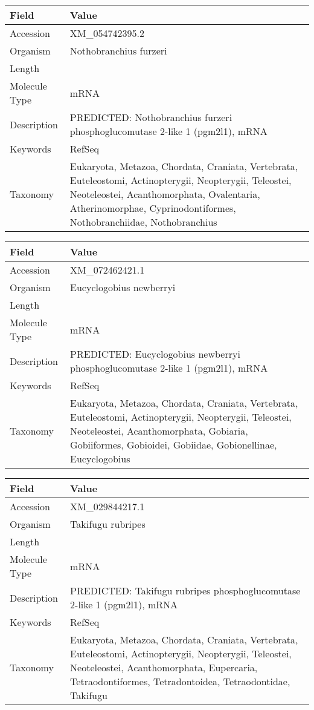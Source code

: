 \documentclass[10pt]{article}
\begin{document}
{\footnotesize
\begin{longtable}{>{\raggedright\arraybackslash}p{4.5cm} >{\raggedright\arraybackslash}p{11.5cm}}
\textbf{Field} & \textbf{Value} \\
\hline
Accession & XM\_054742395.2 \\
Organism & Nothobranchius furzeri \\
Length & 2982 \\
Molecule Type & mRNA \\
Description & PREDICTED: Nothobranchius furzeri phosphoglucomutase 2-like 1 (pgm2l1), mRNA \\
Keywords & RefSeq \\
Taxonomy & Eukaryota, Metazoa, Chordata, Craniata, Vertebrata, Euteleostomi, Actinopterygii, Neopterygii, Teleostei, Neoteleostei, Acanthomorphata, Ovalentaria, Atherinomorphae, Cyprinodontiformes, Nothobranchiidae, Nothobranchius \\
\end{longtable}
}

{\footnotesize
\begin{longtable}{>{\raggedright\arraybackslash}p{4.5cm} >{\raggedright\arraybackslash}p{11.5cm}}
\textbf{Field} & \textbf{Value} \\
\hline
Accession & XM\_072462421.1 \\
Organism & Eucyclogobius newberryi \\
Length & 3030 \\
Molecule Type & mRNA \\
Description & PREDICTED: Eucyclogobius newberryi phosphoglucomutase 2-like 1 (pgm2l1), mRNA \\
Keywords & RefSeq \\
Taxonomy & Eukaryota, Metazoa, Chordata, Craniata, Vertebrata, Euteleostomi, Actinopterygii, Neopterygii, Teleostei, Neoteleostei, Acanthomorphata, Gobiaria, Gobiiformes, Gobioidei, Gobiidae, Gobionellinae, Eucyclogobius \\
\end{longtable}
}

{\footnotesize
\begin{longtable}{>{\raggedright\arraybackslash}p{4.5cm} >{\raggedright\arraybackslash}p{11.5cm}}
\textbf{Field} & \textbf{Value} \\
\hline
Accession & XM\_029844217.1 \\
Organism & Takifugu rubripes \\
Length & 2654 \\
Molecule Type & mRNA \\
Description & PREDICTED: Takifugu rubripes phosphoglucomutase 2-like 1 (pgm2l1), mRNA \\
Keywords & RefSeq \\
Taxonomy & Eukaryota, Metazoa, Chordata, Craniata, Vertebrata, Euteleostomi, Actinopterygii, Neopterygii, Teleostei, Neoteleostei, Acanthomorphata, Eupercaria, Tetraodontiformes, Tetradontoidea, Tetraodontidae, Takifugu \\
\end{longtable}
}
\end{document}
